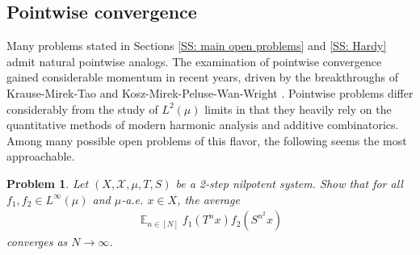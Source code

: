 \documentclass[11pt]{amsart}
\newtheorem{problem}{Problem}
\theoremstyle{definition}
\DeclareMathOperator*{\E}{\mathbb{E}}
\newcommand{\CX}{{\mathcal X}}
\newcommand{\1}{{\mathbf{1}}}
\begin{document}
\subsection{Pointwise convergence} Many problems stated in Sections \ref{SS: main open problems} and \ref{SS: Hardy} admit natural pointwise analogs. The examination of pointwise convergence gained considerable momentum in recent years, driven by the breakthroughs of Krause-Mirek-Tao \cite{KMT20} and Kosz-Mirek-Peluse-Wan-Wright \cite{KMPWW24}. Pointwise problems differ considerably from the study of $L^2(\mu)$ limits in that they heavily rely on the quantitative methods of modern harmonic analysis and additive combinatorics. Among many possible open problems of this flavor, the following seems the most approachable.
\begin{problem}\label{Pr: n, n^2 pointwise}
    Let $(X, \CX, \mu, T, S)$ be a 2-step nilpotent system. Show that for all $f_1, f_2\in L^\infty(\mu)$ and $\mu$-a.e. $x\in X$, the average
    \begin{align*}
        \E_{n\in[N]}f_1(T^n x)f_2(S^{n^2}x)
    \end{align*}
    converges as $N\to\infty$. 
\end{problem}
\end{document}
